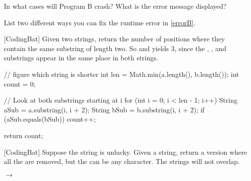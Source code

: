 \Q \label{errorB} In what cases will Program B crash? What is the error message displayed?

\begin{answer}
\end{answer}


\Q List two different ways you can fix the runtime error in \ref{errorB}.

\begin{answer}[3em]
\end{answer}




\newpage

[CodingBat] Given two strings, return the number of positions where they contain the same substring of length two. So  and  yields 3, since the , , and  substrings appear in the same place in both strings.

\medskip
\begin{javalst}
public int stringMatch(String a, String b) {
\end{javalst}

\vspace{-1em}
\begin{answer}[18em]
\begin{javalst}
    // figure which string is shorter
    int len = Math.min(a.length(), b.length());
    int count = 0;
    
    // Look at both substrings starting at i
    for (int i = 0; i < len - 1; i++) {
        String aSub = a.substring(i, i + 2);
        String bSub = b.substring(i, i + 2);
        if (aSub.equals(bSub)) {
            count++;
        }
    }
    
    return count;
\end{javalst}
\end{answer}

\begin{javalst}
}
\end{javalst}

\vfill

[CodingBat] Suppose the string  is unlucky. Given a string, return a version where all the  are removed, but the  can be any character. The  strings will not overlap.

\bigskip

 $\rightarrow$ 

